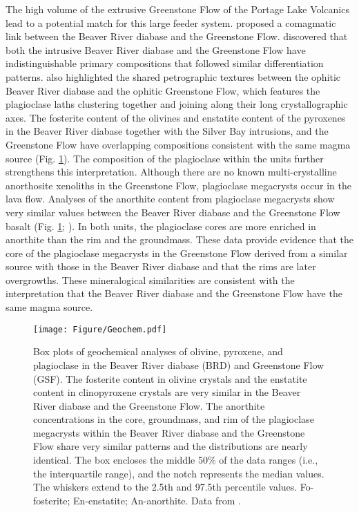 The high volume of the extrusive Greenstone Flow of the Portage Lake Volcanics lead to a potential match for this large feeder system.  proposed a comagmatic link between the Beaver River diabase and the Greenstone Flow.  discovered that both the intrusive Beaver River diabase and the Greenstone Flow have indistinguishable primary compositions that followed similar differentiation patterns.  also highlighted the shared petrographic textures between the ophitic Beaver River diabase and the ophitic Greenstone Flow, which features the plagioclase laths clustering together and joining along their long crystallographic axes. The fosterite content of the olivines and enstatite content of the pyroxenes in the Beaver River diabase together with the Silver Bay intrusions, and the Greenstone Flow have overlapping compositions consistent with the same magma source (Fig. \ref{fig:Geochem}). The composition of the plagioclase within the units further strengthens this interpretation. Although there are no known multi-crystalline anorthosite xenoliths in the Greenstone Flow, plagioclase megacrysts occur in the lava flow. Analyses of the anorthite content from plagioclase megacrysts show very similar values between the Beaver River diabase and the Greenstone Flow basalt (Fig. \ref{fig:Geochem}; ). In both units, the plagioclase cores are more enriched in anorthite than the rim and the groundmass. These data provide evidence that the core of the plagioclase megacrysts in the Greenstone Flow derived from a similar source with those in the Beaver River diabase and that the rims are later overgrowths. These mineralogical similarities are consistent with the interpretation that the Beaver River diabase and the Greenstone Flow have the same magma source. 

\begin{figure}
\centering
\noindent\texttt{[image: Figure/Geochem.pdf]}
\caption{\footnotesize{Box plots of geochemical analyses of olivine, pyroxene, and plagioclase in the Beaver River diabase (BRD) and Greenstone Flow (GSF). The fosterite content in olivine crystals and the enstatite content in clinopyroxene crystals are very similar in the Beaver River diabase and the Greenstone Flow. The anorthite concentrations in the core, groundmass, and rim of the plagioclase megacrysts within the Beaver River diabase and the Greenstone Flow share very similar patterns and the distributions are nearly identical. The box encloses the middle 50\% of the data ranges (i.e., the interquartile range), and the notch represents the median values. The whiskers extend to the 2.5th and 97.5th percentile values. Fo-fosterite; En-enstatite; An-anorthite. Data from .}}
\label{fig:Geochem}
\end{figure}

